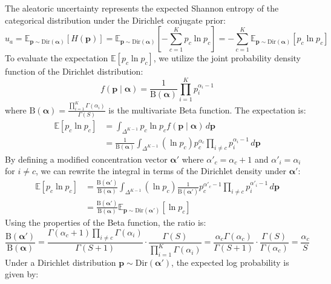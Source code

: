 \documentclass[letterpaper]{article} %
\begin{document}
The aleatoric uncertainty represents the expected Shannon entropy of the categorical distribution under the Dirichlet conjugate prior:
\begin{equation}
    u_a = \mathbb{E}_{\bm{p} \sim \text{Dir}(\bm{\alpha})}[H(\bm{p})] = \mathbb{E}_{\bm{p} \sim \text{Dir}(\bm{\alpha})}\left[ -\sum_{c=1}^K p_c \ln p_c \right] = -\sum_{c=1}^K \mathbb{E}_{\bm{p} \sim \text{Dir}(\bm{\alpha})}[p_c \ln p_c]
\end{equation}
To evaluate the expectation $\mathbb{E}[p_c \ln p_c]$, we utilize the joint probability density function of the Dirichlet distribution:
\begin{equation}
    f(\bm{p} \mid \bm{\alpha}) = \frac{1}{\text{B}(\bm{\alpha})} \prod_{i=1}^K p_i^{\alpha_i - 1}
\end{equation}
where $\text{B}(\bm{\alpha}) = \frac{\prod_{i=1}^K \Gamma(\alpha_i)}{\Gamma(S)}$ is the multivariate Beta function. The expectation is:
\begin{align}
    \mathbb{E}[p_c \ln p_c] &= \int_{\Delta^{K-1}} p_c \ln p_c f(\bm{p} \mid \bm{\alpha}) \, d\bm{p} \nonumber \\
    &= \frac{1}{\text{B}(\bm{\alpha})} \int_{\Delta^{K-1}} (\ln p_c) p_c^{\alpha_c} \prod_{i \ne c} p_i^{\alpha_i - 1} \, d\bm{p}
\end{align}
By defining a modified concentration vector $\bm{\alpha}'$ where $\alpha'_c = \alpha_c + 1$ and $\alpha'_i = \alpha_i$ for $i \ne c$, we can rewrite the integral in terms of the Dirichlet density under $\bm{\alpha}'$:
\begin{align}
    \mathbb{E}[p_c \ln p_c] &= \frac{\text{B}(\bm{\alpha}')}{\text{B}(\bm{\alpha})} \int_{\Delta^{K-1}} (\ln p_c) \frac{1}{\text{B}(\bm{\alpha}')} p_c^{\alpha'_c - 1} \prod_{i \ne c} p_i^{\alpha'_i - 1} \, d\bm{p} \nonumber \\
    &= \frac{\text{B}(\bm{\alpha}')}{\text{B}(\bm{\alpha})} \mathbb{E}_{\bm{p} \sim \text{Dir}(\bm{\alpha}')}[\ln p_c]
\end{align}
Using the properties of the Beta function, the ratio is:
\begin{equation}
    \frac{\text{B}(\bm{\alpha}')}{\text{B}(\bm{\alpha})} = \frac{\Gamma(\alpha_c + 1) \prod_{i \ne c} \Gamma(\alpha_i)}{\Gamma(S + 1)} \cdot \frac{\Gamma(S)}{\prod_{i=1}^K \Gamma(\alpha_i)} = \frac{\alpha_c \Gamma(\alpha_c)}{\Gamma(S + 1)} \cdot \frac{\Gamma(S)}{\Gamma(\alpha_c)} = \frac{\alpha_c}{S}
\end{equation}
Under a Dirichlet distribution $\bm{p} \sim \text{Dir}(\bm{\alpha}')$, the expected log probability is given by:
\end{document}
